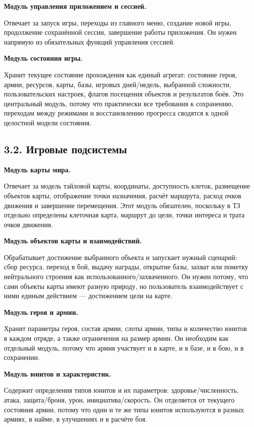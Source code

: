 \documentclass[12pt,a4paper]{article}
\begin{document}
\textbf{Модуль управления приложением и сессией.}

Отвечает за запуск игры, переходы из главного меню, создание новой игры, продолжение сохранённой сессии, завершение работы приложения. Он нужен напрямую из обязательных функций управления сессией.

\textbf{Модуль состояния игры.}

Хранит текущее состояние прохождения как единый агрегат: состояние героя, армии, ресурсов, карты, базы, игровых дней/недель, выбранной сложности, пользовательских настроек, флагов посещения объектов и результатов боёв. Это центральный модуль, потому что практически все требования к сохранению, переходам между режимами и восстановлению прогресса сводятся к одной целостной модели состояния.

\subsection*{3.2. Игровые подсистемы}

\textbf{Модуль карты мира.}

Отвечает за модель тайловой карты, координаты, доступность клеток, размещение объектов карты, отображение точки назначения, расчёт маршрута, расход очков движения и завершение перемещения. Этот модуль обязателен, поскольку в ТЗ отдельно определены клеточная карта, маршрут до цели, точки интереса и трата очков движения.

\textbf{Модуль объектов карты и взаимодействий.}

Обрабатывает достижение выбранного объекта и запускает нужный сценарий: сбор ресурса, переход в бой, выдачу награды, открытие базы, захват или пометку нейтрального строения как использованного/захваченного. Он нужен потому, что сами объекты карты имеют разную природу, но пользователь взаимодействует с ними единым действием --- достижением цели на карте.

\textbf{Модуль героя и армии.}

Хранит параметры героя, состав армии, слоты армии, типы и количество юнитов в каждом отряде, а также ограничения на размер армии. Он необходим как отдельный модуль, потому что армия участвует и в карте, и в базе, и в бою, и в сохранении.

\textbf{Модуль юнитов и характеристик.}

Содержит определения типов юнитов и их параметров: здоровье/численность, атака, защита/броня, урон, инициатива/скорость. Он отделяется от текущего состояния армии, потому что одни и те же типы юнитов используются в разных армиях, в найме, в улучшениях и в расчёте боя.
\end{document}

